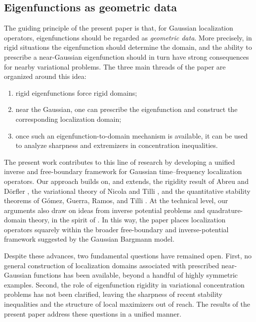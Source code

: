 \subsection{Eigenfunctions as geometric data}

The guiding principle of the present paper is that, for Gaussian localization operators, eigenfunctions should be regarded as \emph{geometric data}. More precisely, in rigid situations the eigenfunction should determine the domain, and the ability to prescribe a near-Gaussian eigenfunction should in turn have strong consequences for nearby variational problems. The three main threads of the paper are organized around this idea:
\begin{enumerate}
\item rigid eigenfunctions force rigid domains;
\item near the Gaussian, one can prescribe the eigenfunction and construct the corresponding localization domain;
\item once such an eigenfunction-to-domain mechanism is available, it can be used to analyze sharpness and extremizers in concentration inequalities.
\end{enumerate}

The present work contributes to this line of research by developing a unified inverse and free-boundary framework for Gaussian time--frequency localization operators. Our approach builds on, and extends, the rigidity result of Abreu and D\"orfler \cite{Abreu-Doerfler}, the variational theory of Nicola and Tilli \cite{Nicola-Tilli,Nicola-Tilli-2}, and the quantitative stability theorems of G\'omez, Guerra, Ramos, and Tilli \cite{Gomez-Guerra-Ramos-Tilli}. At the technical level, our arguments also draw on ideas from inverse potential problems and quadrature-domain theory, in the spirit of \cite{Isakov,Cherednichenko,Gustafsson,Gustafsson-Shahgholian,Shahgholian}. In this way, the paper places localization operators squarely within the broader free-boundary and inverse-potential framework suggested by the Gaussian Bargmann model.

Despite these advances, two fundamental questions have remained open. First, no general construction of localization domains associated with prescribed near-Gaussian functions has been available, beyond a handful of highly symmetric examples. Second, the role of eigenfunction rigidity in variational concentration problems has not been clarified, leaving the sharpness of recent stability inequalities and the structure of local maximizers out of reach. The results of the present paper address these questions in a unified manner.

